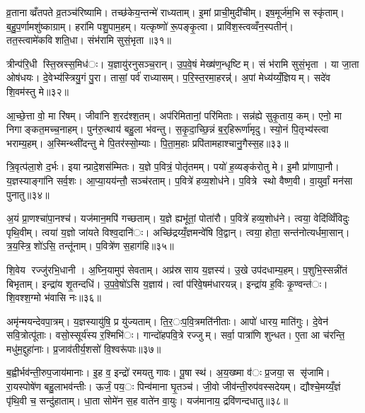 व्र॒तानाव्व्रँतपते व्र॒तञ्च॑रिष्यामि। तच्छ॑केय॒न्तन्मे॑ राध्यताम्। इ॒मां प्राची॒मुदी॑चीम्। इष॒मूर्ज॑म॒भि सस्कृ॑ताम्। ब॒हु॒प॒र्णामशु॑ष्काग्राम्। हरा॑मि पशु॒पाम॒हम्। यत्कृष्णो॑ रू॒पङ्कृ॒त्वा। प्रावि॑श॒स्त्वव्वँन॒स्पतीन्॑। तत॒स्त्वामे॑कविशति॒धा। संभ॑रामि सुसं॒भृता॥३१॥

त्रीन्प॑रि॒धी स्ति॒स्रस्स॒मिध॑ः। य॒ज्ञायु॑रनुसञ्च॒रान्। उ॒प॒वे॒षं मेख्ष॑ण॒न्धृष्टिम्। सं भ॑रामि सुसं॒भृता। या जा॒ता ओष॑धयः। दे॒वेभ्य॑स्त्रियु॒गं पु॒रा। तासां॒ पर्व॑ राध्यासम्। प॒रि॒स्त॒रमा॒हरन्न्॑॑। अ॒पां मेध्य॑य्यँ॒ज्ञियम्। सदे॑व शि॒वम॑स्तु मे॥३२॥

आ॒च्छे॒त्ता वो॒ मा रि॑षम्। जीवा॑नि श॒रद॑श्श॒तम्। अप॑रिमितानां॒ परि॑मिताः। सन्न॑ह्ये सुकृ॒ताय॒ कम्। एनो॒ मा निगाङ्कत॒मच्च॒नाहम्। पुन॑रु॒त्थाय॑ बहु॒ला भ॑वन्तु। स॒कृ॒दा॒च्छि॒न्नं ब॒र्॒हिरूर्णा॑मृदु। स्यो॒नं पि॒तृभ्य॑स्त्वा भराम्य॒हम्। अ॒स्मिन्थ्सी॑दन्तु मे पि॒तर॑स्सो॒म्याः। पि॒ता॒म॒हाः प्रपि॑तामहाश्चानु॒गैस्स॒ह॥३३॥

त्रि॒वृत्प॑ला॒शे द॒र्भः। इयान्प्रादे॒शस॑म्मितः। य॒ज्ञे प॒वित्रं॒ पोतृ॑तमम्। पयो॑ ह॒व्यङ्क॑रोतु मे। इ॒मौ प्रा॑णापा॒नौ। य॒ज्ञस्याङ्गा॑नि सर्व॒शः। आ॒प्या॒यय॑न्तौ॒ सञ्च॑रताम्। प॒वित्रे॑ हव्य॒शोध॑ने। प॒वित्रे स्थो वैष्ण॒वी। वा॒युर्वां॒ मन॑सा पुनातु॥३४॥

अ॒यं प्रा॒णश्चा॑पा॒नश्च॑। यज॑मान॒मपि॑ गच्छताम्। य॒ज्ञे ह्यभू॑तां॒ पोता॑रौ। प॒वित्रे॑ हव्य॒शोध॑ने। त्वया॒ वेदि॑व्विँविदुः पृथि॒वीम्। त्वया॑ य॒ज्ञो जा॑यते विश्व॒दानि॑ः। अच्छि॑द्रय्यँ॒ज्ञमन्वे॑षि वि॒द्वान्। त्वया॒ होता॒ सन्त॑नोत्यर्धमा॒सान्। त्र॒य॒स्त्रि॒शो॑ऽसि॒ तन्तू॑नाम्। प॒वित्रे॑ण स॒हाग॑हि॥३५॥

शि॒वेय रज्जु॑रभि॒धानी। अ॒घ्नि॒यामुप॑ सेवताम्। अप्र॑स्रसाय य॒ज्ञस्य॑। उ॒खे उप॑दधाम्य॒हम्। प॒शुभि॒स्सन्नी॑तं बिभृताम्। इन्द्रा॑य शृ॒तन्दधि॑। उ॒प॒वे॒षो॑ऽसि य॒ज्ञाय॑। त्वां प॑रिवे॒षम॑धारयन्न्। इन्द्रा॑य ह॒विः कृ॒ण्वन्त॑ः। शि॒वश्श॒ग्मो भ॑वासि नः॥३६॥

अमृ॑न्मयन्देवपा॒त्रम्। य॒ज्ञस्यायु॑षि॒ प्र यु॑ज्यताम्। ति॒र॒ःप॒वि॒त्रमति॑नीताः। आपो॑ धारय॒ माति॑गुः। दे॒वेन॑ सवि॒त्रोत्पू॑ताः। वसो॒स्सूर्य॑स्य र॒श्मिभि॑ः। गान्दो॑हपवि॒त्रे रज्जुम्। सर्वा॒ पात्रा॑णि शुन्धत। ए॒ता आ च॑रन्ति॒ मधु॑म॒द्दुहा॑नाः। प्र॒जाव॑तीर्य॒शसो॑ वि॒श्वरू॑पाः॥३७॥

ब॒ह्वीर्भव॑न्ती॒रुप॒जाय॑मानाः। इ॒ह व॒ इन्द्रो॑ रमयतु गावः। पू॒षा स्थ॑। अ॒य॒ख्ष्मा व॑ः प्र॒जया॒ स सृ॑जामि। रा॒यस्पोषे॑ण बहु॒लाभव॑न्तीः। ऊर्जं॒ पय॒ः पिन्व॑माना घृ॒तञ्च॑। जी॒वो जीव॑न्ती॒रुप॑वस्सदेयम्। द्यौश्चे॒मय्यँ॒ज्ञं पृ॑थि॒वी च॒ सन्दु॑हाताम्। धा॒ता सोमे॑न स॒ह वाते॑न वा॒युः। यज॑मानाय॒ द्रवि॑णन्दधातु॥३८॥

